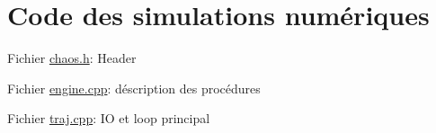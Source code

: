 
\section{Code des simulations numériques}

{\small
\noindent Fichier \underline{chaos.h}: 
Header
%


\noindent Fichier \underline{engine.cpp}: 
déscription des procédures
%

\noindent Fichier \underline{traj.cpp}: 
IO et loop principal
%
}







